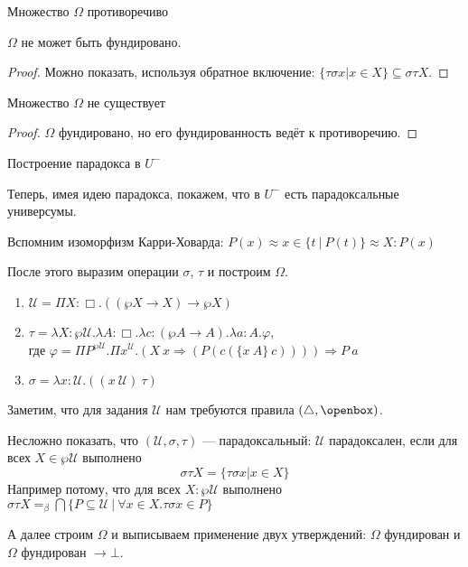 \documentclass[aspectratio=169,dvipsnames,usenames]{beamer}
\begin{document}
\begin{frame}{Множество $\Omega$ противоречиво}
\begin{lmm} $\Omega$ не может быть фундировано. \end{lmm}
\begin{proof} Можно показать, используя обратное включение: $\{\tau\sigma x| x \in X\} \subseteq \sigma\tau X$.\end{proof}

\begin{thm}Множество $\Omega$ не существует\end{thm}
\begin{proof}$\Omega$ фундировано, но его фундированность ведёт к противоречию.\end{proof}
\end{frame}

\begin{frame}{Построение парадокса в $U^-$}

Теперь, имея идею парадокса, покажем, что в $U^-$ есть парадоксальные универсумы.

Вспомним изоморфизм Карри-Ховарда: $P(x) \approx x \in \{ t\ |\ P(t)\} \approx X : P(x)$

После этого выразим операции $\sigma$, $\tau$ и построим $\Omega$.

\begin{enumerate}
\item $\mathcal{U} = \Pi X : \Box . ((\wp X \rightarrow X) \rightarrow \wp X)$
\item $\tau = \lambda X : \wp\mathcal{U}. \lambda A : \Box.\lambda c : (\wp A \rightarrow A).\lambda a : A.\varphi$,\\
где
 $\varphi = \Pi P^{\wp \mathcal{U}}.\Pi x^\mathcal{U}.(X\ x\Rightarrow (P (c (\{x\ A\}\ c)))) \Rightarrow P\ a$

\item $\sigma = \lambda x : \mathcal{U} . ((x\ \mathcal{U})\ \tau)$
\end{enumerate}

Заметим, что для задания $\mathcal{U}$ нам требуются правила $(\triangle,\openbox)$.

Несложно показать, что $(\mathcal{U},\sigma,\tau)$ --- парадоксальный:
$\mathcal{U}$ парадоксален, если для всех $X \in \wp\mathcal{U}$ выполнено $$\sigma\tau X = \{\tau\sigma x | x \in X \}$$
Например потому, что для всех $X: \wp \mathcal{U}$ выполнено $\sigma\tau X =_\beta \bigcap \{ P \subseteq \mathcal{U}\ |\ \forall x \in X.\tau\sigma x \in P \}$

А далее строим $\Omega$ и выписываем применение двух утверждений:
$\Omega$ фундирован и $\Omega$ фундирован $\rightarrow \bot$.
\end{frame}
\end{document}
